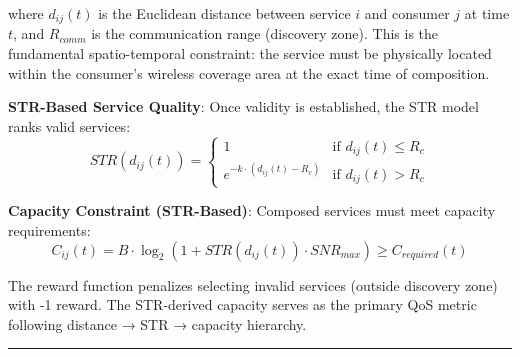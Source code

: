 where \(d_{ij}(t)\) is the Euclidean distance between service \(i\) and
consumer \(j\) at time \(t\), and \(R_{comm}\) is the communication
range (discovery zone). This is the fundamental spatio-temporal
constraint: the service must be physically located within the consumer's
wireless coverage area at the exact time of composition.

\textbf{STR-Based Service Quality}: Once validity is established, the
STR model ranks valid services:
\[STR(d_{ij}(t)) = \begin{cases} 1 & \text{if } d_{ij}(t) \leq R_c \\ e^{-k \cdot (d_{ij}(t) - R_c)} & \text{if } d_{ij}(t) > R_c \end{cases}\]

\textbf{Capacity Constraint (STR-Based)}: Composed services must meet
capacity requirements:
\[C_{ij}(t) = B \cdot \log_2(1 + STR(d_{ij}(t)) \cdot SNR_{max}) \geq C_{required}(t)\]

The reward function penalizes selecting invalid services (outside
discovery zone) with -1 reward. The STR-derived capacity serves as the
primary QoS metric following distance → STR → capacity hierarchy.

\begin{center}\rule{0.5\linewidth}{0.5pt}\end{center}

